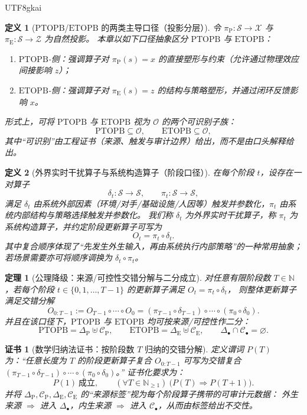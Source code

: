 \documentclass[12pt]{article}
\newtheorem{definition}{定义}[section]
\newtheorem{theorem}{定理}[section]
\newtheorem{Certificate}{证书}[section]
\newcommand{\NN}{\mathbb{N}}
\newcommand{\PTOPB}{\ensuremath{\mathrm{PTOPB}}}
\newcommand{\ETOPB}{\ensuremath{\mathrm{ETOPB}}}
\begin{document}
\begin{CJK*}{UTF8}{gkai}
\begin{definition}[\PTOPB/\ETOPB{} 的两类主导口径（投影分层）]
令 $\pi_{\mathrm{P}}:\mathcal{S}\to\mathcal{X}$ 与 $\pi_{\mathrm{E}}:\mathcal{S}\to\mathcal{Z}$ 为自然投影。
本章以如下口径抽象区分 \PTOPB{} 与 \ETOPB{}：
\begin{enumerate}
  \item $\PTOPB$-侧：强调算子对 $\pi_{\mathrm{P}}(s)=x$ 的直接塑形与约束（允许通过物理效应间接影响 $z$）；
  \item $\ETOPB$-侧：强调算子对 $\pi_{\mathrm{E}}(s)=z$ 的结构与策略塑形，并通过闭环反馈影响 $x$。
\end{enumerate}
形式上，可将 \PTOPB{} 与 \ETOPB{} 视为 $\mathcal{O}$ 的两个可识别子族：
\[
  \PTOPB \subseteq \mathcal{O},\qquad
  \ETOPB \subseteq \mathcal{O},
\]
其中“可识别”由工程证书（来源、触发与审计边界）给出，而不是由口头解释给出。
\end{definition}

\begin{definition}[外界实时干扰算子与系统构造算子（阶段口径）]
在每个阶段 $t$，设存在一对算子
\[
  \delta_t:\mathcal{S}\to\mathcal{S},\qquad
  \pi_t:\mathcal{S}\to\mathcal{S},
\]
满足 $\delta_t$ 由系统外部因素（环境/对手/基础设施/人因等）触发并参数化，$\pi_t$ 由系统内部结构与策略选择触发并参数化。
我们称 $\delta_t$ 为外界实时干扰算子，称 $\pi_t$ 为系统构造算子，并约定阶段更新算子可写为
\[
  O_t = \pi_t\circ \delta_t.
\]
其中复合顺序体现了“先发生外生输入，再由系统执行内部策略”的一种常用抽象；若场景需要亦可将顺序调换为 $\delta_t\circ \pi_t$。
\end{definition}

\begin{theorem}[公理降级：来源/可控性交错分解与二分成立]
\label{thm:source-controllability-splitting}
对任意有限阶段数 $T\in\mathbb{N}$，若每个阶段 $t\in\{0,1,\dots,T-1\}$ 的更新算子满足 $O_t=\pi_t\circ\delta_t$，
则整体更新算子满足交错分解
\[
  O_{0:T-1}
  :=
  O_{T-1}\circ\cdots\circ O_0
  =
  (\pi_{T-1}\circ\delta_{T-1})\circ\cdots\circ(\pi_0\circ\delta_0).
\]
并且在该口径下，\PTOPB{} 与 \ETOPB{} 均可按来源/可控性作二分：
\[
  \PTOPB = \Delta_{\mathrm{P}}\uplus \mathcal{C}_{\mathrm{P}},
  \qquad
  \ETOPB = \Delta_{\mathrm{E}}\uplus \mathcal{C}_{\mathrm{E}},
  \qquad
  \Delta_{\bullet}\cap \mathcal{C}_{\bullet}=\varnothing.
\]
\end{theorem}

\begin{Certificate}[数学归纳法证书：按阶段数 $T$ 归纳的交错分解]
\label{cert:splitting-by-time-horizon}
定义谓词 $P(T)$ 为：“任意长度为 $T$ 的阶段更新算子复合 $O_{0:T-1}$ 可写为交错复合 $(\pi_{T-1}\circ\delta_{T-1})\circ\cdots\circ(\pi_0\circ\delta_0)
  $。”
证书化要求为：
\[
  P(1)\ \text{成立},\qquad
  (\forall T\in\NN_{\ge 1})\ \bigl(P(T)\Rightarrow P(T+1)\bigr).
\]
并将 $\Delta_{\mathrm{P}},\mathcal{C}_{\mathrm{P}},\Delta_{\mathrm{E}},\mathcal{C}_{\mathrm{E}}$ 的“来源标签”视为每个阶段算子携带的可审计元数据：
外生来源 $\Rightarrow$ 进入 $\Delta_{\bullet}$，内生来源 $\Rightarrow$ 进入 $\mathcal{C}_{\bullet}$，从而由标签给出不交性。
\end{Certificate}


\end{CJK*}
\end{document}
